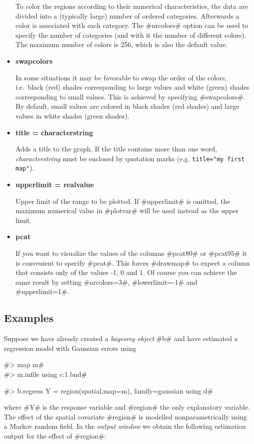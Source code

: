 \begin{itemize}
To color the regions according to their numerical characteristics,
the data are divided into a (typically large) number of ordered
categories. Afterwards a color is associated with each category.
The #nrcolors# option can be used to specify the number of
categories (and with it the number of different colors). The
maximum number of colors is 256, which is also the default value.
\item {\bf swapcolors}

In some situations it may be favorable to swap the order of the
colors, i.e.~black (red) shades corresponding to large values and
white (green) shades corresponding to small values. This is
achieved by specifying #swapcolors#. By default, small values are
colored in black shades (red shades) and large values in white
shades (green shades).
\item {\bf title = characterstring}

Adds a title to the graph. If the title contains more than one
word, {\em characterstring} must be enclosed by quotation marks
(e.g. \texttt{title="my first map"}).
\item {\bf upperlimit = realvalue}

Upper limit of the range to be plotted. If #upperlimit# is
omitted, the maximum numerical value in #plotvar# will be used
instead as the upper limit.
\item {\bf pcat}

If you want to visualize the values of the columns #pcat80# or
#pcat95# it is convenient to specify #pcat#. This forces #drawmap#
to expect a column that consists only of the values -1, 0 and 1.
Of course you can achieve the same result by setting #nrcolors=3#,
#lowerlimit=-1# and #upperlimit=1#.
\end{itemize}


\subsection*{Examples}

Suppose we have already created a {\em bayesreg object} #b# and
have estimated a regression model with Gaussian errors using

#> map m# \\
#> m.infile using c:\maps\map1.bnd#

#> b.regress Y = region(spatial,map=m), family=gaussian using d#

where #Y# is the response variable and #region# the only
explanatory variable. The effect of the spatial covariate #region#
is modelled nonparametrically  using a Markov random field. In the
{\em output window} we obtain the following estimation output for
the effect of #region#:

